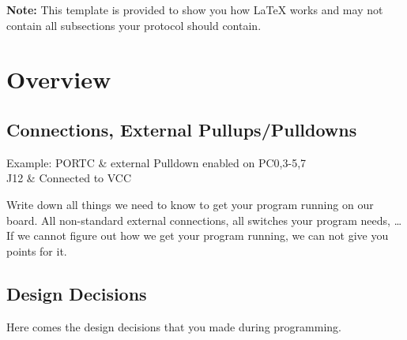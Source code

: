 \documentclass[12pt,a4paper,titlepage,oneside]{article}
\begin{document}
\MakeTitleAndTOC



\noindent
\textbf{Note:} This template is provided to show you how \LaTeX{} works and may
not contain all subsections your protocol should contain.



\section{Overview}

\subsection{Connections,  External Pullups/Pulldowns}
Example:
PORTC & external Pulldown enabled on PC0,3-5,7 \\
J12 & Connected to VCC \\
\eConnections

Write down all things we need to know to get your program running on our board.
All non-standard external connections, all switches your program needs, \dots
If we cannot figure out how we get your program running, we can not give you
points for it.


\subsection{Design Decisions}

Here comes the design decisions that you made during programming.
\end{document}
